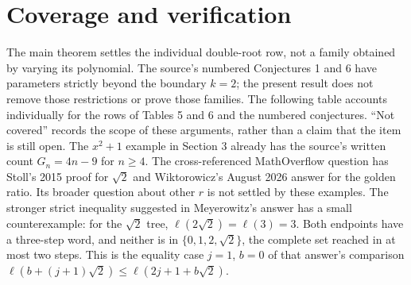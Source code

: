 \documentclass[11pt]{article}
\begin{document}
\section{Coverage and verification}
The main theorem settles the individual double-root row, not a family
obtained by varying its polynomial. The source's numbered Conjectures
1 and 6 have parameters strictly beyond the boundary $k=2$; the present
result does not remove those restrictions or prove those families.
The following table accounts individually for the rows of Tables 5 and 6
and the numbered conjectures. ``Not covered'' records the scope of
these arguments, rather than a claim that the item is still open.
The $x^2+1$ example in Section 3 already has the source's written
count $G_n=4n-9$ for $n\geq4$. The cross-referenced MathOverflow
question \cite{stoll} has Stoll's 2015 proof for $\sqrt2$ and
Wiktorowicz's August 2026 answer for the golden ratio. Its broader
question about other $r$ is not settled by these examples.
The stronger strict inequality suggested in Meyerowitz's answer
\cite{meyerowitz} has a small counterexample: for the $\sqrt2$ tree,
$\ell(2\sqrt2)=\ell(3)=3$. Both endpoints have a three-step word,
and neither is in $\{0,1,2,\sqrt2\}$, the complete set reached in at
most two steps. This is the equality case $j=1$, $b=0$ of that answer's
comparison $\ell(b+(j+1)\sqrt2)\leq\ell(2j+1+b\sqrt2)$.
\small
\end{document}
